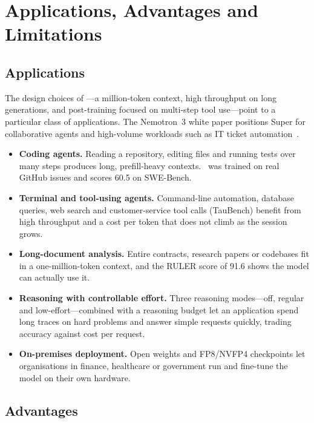 \chapter{Applications, Advantages and Limitations}
\label{ch:adv}
\label{ch:apps}

\section{Applications}

The design choices of \NS---a million-token context, high throughput on long
generations, and post-training focused on multi-step tool use---point to a
particular class of applications. The Nemotron~3 white paper positions Super
for collaborative agents and high-volume workloads such as IT ticket
automation~\cite{nvidia2025nemotron3}.

\begin{itemize}
  \item \textbf{Coding agents.} Reading a repository, editing files and
        running tests over many steps produces long, prefill-heavy contexts.
        \NS\ was trained on real GitHub issues and scores 60.5 on SWE-Bench.
  \item \textbf{Terminal and tool-using agents.} Command-line automation,
        database queries, web search and customer-service tool calls
        (TauBench) benefit from high throughput and a cost per token that does
        not climb as the session grows.
  \item \textbf{Long-document analysis.} Entire contracts, research papers or
        codebases fit in a one-million-token context, and the RULER score of
        91.6 shows the model can actually use it.
  \item \textbf{Reasoning with controllable effort.} Three reasoning
        modes---off, regular and low-effort---combined with a reasoning budget
        let an application spend long traces on hard problems and answer simple
        requests quickly, trading accuracy against cost per request.
  \item \textbf{On-premises deployment.} Open weights and FP8/NVFP4
        checkpoints let organisations in finance, healthcare or government run
        and fine-tune the model on their own hardware.
\end{itemize}

\section{Advantages}

